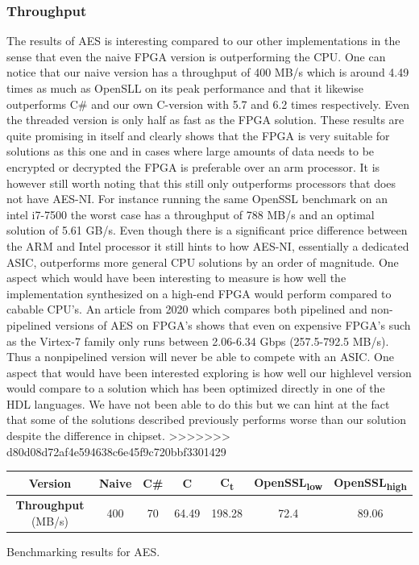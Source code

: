 \documentclass[a4paper]{article}
\begin{document}
\begin{enumerate}
\subsubsection{Throughput}
\label{sec:orgfcc8bc4}
The results of AES is interesting compared to our other implementations in the sense that even the naive FPGA version is outperforming the CPU. One can notice that our naive version has a throughput of 400 MB/s which is around 4.49 times as much as OpenSLL on its peak performance and that it likewise outperforms C\# and our own C-version with 5.7 and 6.2 times respectively. Even the threaded version is only half as fast as the FPGA solution. These results are quite promising in itself and clearly shows that the FPGA is very suitable for solutions as this one and in cases where large amounts of data needs to be encrypted or decrypted the FPGA is preferable over an arm processor. It is however still worth noting that this still only outperforms processors that does not have AES-NI. For instance running the same OpenSSL benchmark on an intel i7-7500 the worst case has a throughput of 788 MB/s and an optimal solution of 5.61 GB/s. Even though there is a significant price difference between the ARM and Intel processor it still hints to how AES-NI, essentially a dedicated ASIC, outperforms more general CPU solutions by an order of magnitude. One aspect which would have been interesting to measure is how well the implementation synthesized on a high-end FPGA would perform compared to cabable CPU's. An article from 2020 which compares both pipelined and non-pipelined versions of AES on FPGA's shows that even on expensive FPGA's such as the Virtex-7 family only runs between 2.06-6.34 Gbps (257.5-792.5 MB/s)\cite{FPGA_AES}. Thus a nonpipelined version will never be able to compete with an ASIC. One aspect that would have been interested exploring is how well our highlevel version would compare to a solution which has been optimized directly in one of the HDL languages. We have not been able to do this but we can hint at the fact that some of the solutions described previously performs worse than our solution despite the difference in chipset.
>>>>>>> d80d08d72af4e594638c6e45f9c720bbf3301429
\begin{table}[htbp]
\centering
\begin{tabular}{|c|c|c|c|c|c|c|}
\hline
\textbf{Version} & Naive & C\# & C & C\textsubscript{t} & OpenSSL\textsubscript{low} & OpenSSL\textsubscript{high}\\
\hline
\textbf{Throughput} (MB/s) & 400 & 70 & 64.49 & 198.28 & 72.4 & 89.06\\
\hline
\end{tabular}
Benchmarking results for AES.


\end{table}
\end{enumerate}
\end{document}
